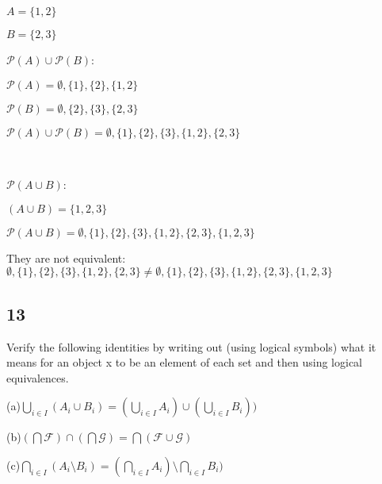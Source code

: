 \documentclass{article}
\begin{document}
$A= \{ 1,2 \}$

$B= \{ 2,3 \}$

$\mathscr{P}(A) \cup \mathscr{P}(B)$:

$\mathscr{P}(A)= \emptyset,\{ 1 \}, \{ 2 \}, \{ 1,2 \} $

$\mathscr{P}(B)= \emptyset,\{ 2 \}, \{ 3 \}, \{ 2,3 \}$

$\mathscr{P}(A) \cup \mathscr{P}(B)=\emptyset,\{ 1 \}, \{ 2 \}, \{ 3 \} ,\{ 1,2 \}, \{ 2,3 \} $

\

$\mathscr{P}(A \cup B)$:

$(A \cup B)= \{ 1,2,3 \}$

$\mathscr{P}(A \cup B)=\emptyset,\{ 1\}, \{ 2\}, \{ 3\},\{ 1,2 \}, \{ 2,3 \}, \{ 1,2,3 \}$

They are not equivalent:
$\emptyset,\{ 1 \}, \{ 2 \}, \{ 3 \} ,\{ 1,2 \}, \{ 2,3 \} \neq \emptyset,\{ 1\}, \{ 2\}, \{ 3\},\{ 1,2 \}, \{ 2,3 \}, \{ 1,2,3 \}$
\subsection{13}
Verify the following identities by writing out (using logical symbols)
what it means for an object x to be an element of each set and then
using logical equivalences.

(a)$\bigcup_{i \in I}(A_i \cup B_i)= (\bigcup_{i \in I} A_i)\cup(\bigcup_{i \in I} B_i))$

(b)$(\bigcap \mathcal{F})\cap(\bigcap \mathcal{G})= \bigcap(\mathcal{F} \cup \mathcal{G})$

(c)$\bigcap_{i \in I}(A_i \setminus B_i)= (\bigcap_{i \in I} A_i) \setminus \bigcap_{i \in I} B_i)$
\end{document}
